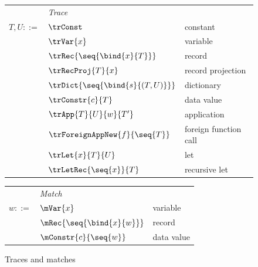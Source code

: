 \begin{figure}
\begin{minipage}[t]{0.52\textwidth}
\begin{tabularx}{\textwidth}{rL{2.8cm}L{3.4cm}}
   &\textit{Trace}&
   \\
   $T, U ::=$
   &
   $\trConst$
   &
   constant
   \\
   &
   $\trVar{x}$
   &
   variable
   \\
   &
   $\trRec{\seq{\bind{x}{T}}}$
   &
   record
   \\
   &
   $\trRecProj{T}{x}$
   &
   record projection
   \\
   &
   $\trDict{\seq{\bind{s}{(T, U)}}}$
   &
   dictionary
   \\
   &
   $\trConstr{c}{T}$
   &
   data value
   \\
   &
   $\trApp{T}{U}{w}{T'}$
   &
   application
   \\
   &
   $\trForeignAppNew{f}{\seq{T}}$
   &
   foreign function call
   \\
   &
   $\trLet{x}{T}{U}$
   &
   let
   \\
   &
   $\trLetRec{\seq{x}}{T}$
   &
   recursive let
\end{tabularx}
\end{minipage}%
\hspace{6mm}
\begin{minipage}[t]{0.42\textwidth}
\begin{tabularx}{\textwidth}{rL{2.5cm}L{2.9cm}}
   &\textit{Match}&
   \\
   $w ::=$
   &
   $\mVar{x}$
   &
   variable
   \\
   &
   $\mRec{\seq{\bind{x}{w}}}$
   &
   record
   \\
   &
   $\mConstr{c}{\seq{w}}$
   &
   data value
   \\[41mm]
\end{tabularx}
\end{minipage}
\caption{Traces and matches}
\end{figure}
